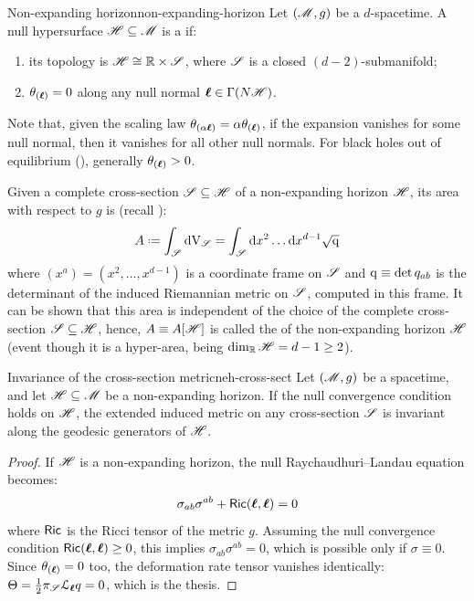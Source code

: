 \begin{definition}{Non-expanding horizon}{non-expanding-horizon}
  Let $ (\mathscr{M} , g) $ be a $ d $-spacetime. A null hypersurface $ \mathscr{H} \subseteq \mathscr{M} $ is a  if:
  \begin{enumerate}
    \item \label{item:neh-1} its topology is $ \mathscr{H} \cong \mathbb{R} \times \mathscr{S} $, where $ \mathscr{S} $ is a closed $ (d-2) $-submanifold;
    \item \label{item:neh-2} $ \theta_{(\boldsymbol{\ell})} = 0 $ along any null normal $ \boldsymbol{\ell} \in \Gamma(N \mathscr{H}) $.
  \end{enumerate}
\end{definition}

Note that, given the scaling law $ \theta_{(\alpha \boldsymbol{\ell})} = \alpha \theta_{(\boldsymbol{\ell})} $, if the expansion vanishes for some null normal, then it vanishes for all other null normals. For black holes out of equilibrium (), generally $ \theta_{(\boldsymbol{\ell})} > 0 $.

Given a complete cross-section $ \mathscr{S} \subseteq \mathscr{H} $ of a non-expanding horizon $ \mathscr{H} $, its area with respect to $ g $ is (recall ):
\begin{equation}
  A \defeq \int_\crs \volf_\crs = \int_\crs \dd x^2 \dots \dd x^{d-1} \sqrt{\mt{q}}
\end{equation}
where $ (x^a) = (x^2 , \dots , x^{d-1}) $ is a coordinate frame on $ \mathscr{S} $ and $ \mathrm{q} \equiv \det q_{ab} $ is the determinant of the induced Riemannian metric on $ \mathscr{S} $, computed in this frame. It can be shown that this area is independent of the choice of the complete cross-section $ \mathscr{S} \subseteq \mathscr{H} $, hence, $ A \equiv A[\mathscr{H}] $ is called the  of the non-expanding horizon $ \mathscr{H} $ (event though it is a hyper-area, being $ \dim_{\mathbb{R}} \mathscr{H} = d - 1 \geq 2 $).

\begin{proposition}{Invariance of the cross-section metric}{neh-cross-sect}
  Let $ (\mathscr{M} , g) $ be a spacetime, and let $ \mathscr{H} \subseteq \mathscr{M} $ be a non-expanding horizon. If the null convergence condition holds on $ \mathscr{H} $, the extended induced metric on any cross-section $ \mathscr{S} $ is invariant along the geodesic generators of $ \mathscr{H} $.
\end{proposition}

\begin{proofbox}
  \begin{proof}
    If $ \mathscr{H} $ is a non-expanding horizon, the null Raychaudhuri--Landau equation  becomes:
    \begin{equation*}
      \sigma_{ab} \sigma^{ab} + \textsf{Ric}(\boldsymbol{\ell} , \boldsymbol{\ell}) = 0
    \end{equation*}
    where $ \textsf{Ric} $ is the Ricci tensor of the metric $ g $. Assuming the null convergence condition $ \textsf{Ric}(\boldsymbol{\ell} , \boldsymbol{\ell}) \geq 0 $, this implies $ \sigma_{ab} \sigma^{ab} = 0 $, which is possible only if $ \sigma \equiv 0 $. Since $ \theta_{(\boldsymbol{\ell})} = 0 $ too, the deformation rate tensor vanishes identically: $ \Theta = \frac{1}{2} \pi_\mathscr{S} \EuScript{L}_{\boldsymbol{\ell}} q = 0 $, which is the thesis.
  \end{proof}
\end{proofbox}


